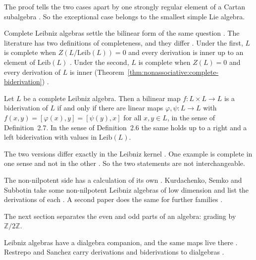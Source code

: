 The proof tells the two cases apart by one strongly regular element of a
Cartan subalgebra \cite[p.~1530]{Kurbanbaev2025}. So the exceptional case
belongs to the smallest simple Lie algebra.

Complete Leibniz algebras settle the bilinear form of the same question
\cite[Definitions~2.6--2.7, p.~6]{DiBartoloDiFattaLaRosa2025Leibniz}. The
literature has two definitions of completeness, and they differ
\cite[Definitions~2.6--2.7, p.~6]{DiBartoloDiFattaLaRosa2025Leibniz}. Under
the first, $L$ is complete when $Z(L/\mathrm{Leib}(L))=0$ and every derivation
is inner up to an element of $\mathrm{Leib}(L)$ \cite[Definition~2.6,
p.~6]{DiBartoloDiFattaLaRosa2025Leibniz}. Under the second, $L$ is complete
when $Z(L)=0$ and every derivation of $L$ is inner
(Theorem~\ref{thm:nonassociative:complete-biderivation}) \cite[Definition~2.7,
p.~6]{DiBartoloDiFattaLaRosa2025Leibniz}.\begin{theorem}\label{thm:nonassociative:complete-biderivation}
Let $L$ be a complete Leibniz algebra. Then a bilinear map $f\colon L\times
L\to L$ is a biderivation of $L$ if and only if there are linear maps
$\varphi,\psi\colon L\to L$ with $f(x,y)=[\varphi(x),y]=[\psi(y),x]$ for all
$x,y\in L$, in the sense of Definition~2.7. In the sense of Definition~2.6 the
same holds up to a right and a left biderivation with values in
$\mathrm{Leib}(L)$. \end{theorem}

The two versions differ exactly in the Leibniz kernel
\cite[pp.~7--8]{DiBartoloDiFattaLaRosa2025Leibniz}. One example is complete in
one sense and not in the other \cite[Example~2.7.1,
p.~6]{DiBartoloDiFattaLaRosa2025Leibniz}. So the two statements are not
interchangeable.

The non-nilpotent side has a calculation of its own
\cite[Theorems~1--3, pp.~120--126]{KurdachenkoSemkoSubbotin2025}. Kurdachenko, Semko and
Subbotin take some non-nilpotent Leibniz algebras of low dimension and list
the derivations of each \cite[Theorems~1--3,
pp.~120--126]{KurdachenkoSemkoSubbotin2025}. A second paper does the same for
further families \cite[Theorems~1--2,
pp.~209--211]{KurdachenkoSemkoSubbotin2025b}.

The next section separates the even and odd parts of an algebra:
grading by $\mathbb{Z}/2\mathbb{Z}$.

Leibniz algebras have a dialgebra companion, and the same maps live there
\cite[Abstract]{RestrepoSanchezDialgebras2026}. Restrepo and Sanchez carry
derivations and biderivations to dialgebras
\cite[Abstract]{RestrepoSanchezDialgebras2026}.

